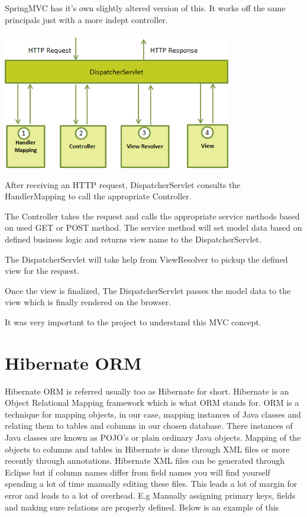 SpringMVC has it's own slightly altered version of this. It works off the same principals just with a more indept controller.

\begin{center}    
	\includegraphics[height=6cm, width=10cm]{img/springmvc.png}
\end{center}

\noindent After receiving an HTTP request, DispatcherServlet consults the HandlerMapping to call the appropriate Controller. \newline

\noindent The Controller takes the request and calls the appropriate service methods based on used GET or POST method. The service method will set model data based on defined business logic and returns view name to the DispatcherServlet. \newline

\noindent The DispatcherServlet will take help from ViewResolver to pickup the defined view for the request. \newline 

\noindent Once the view is finalized, The DispatcherServlet passes the model data to the view which is finally rendered on the browser. \newline

\noindent It was very important to the project to understand this MVC concept.

\section{Hibernate ORM}

Hibernate ORM is referred usually too as Hibernate for short. Hibernate is an Object Relational Mapping framework which is what ORM stands for. ORM is a technique for mapping objects, in our case, mapping instances of Java classes and relating them to tables and columns in our chosen database. There instances of Java classes are known as POJO's or plain ordinary Java objects. Mapping of the objects to columns and tables in Hibernate is done through XML files or more recently through annotations. Hibernate XML files can be generated through Eclipse but if column names differ from field names you will find yourself spending a lot of time manually editing these files. This leads a lot of margin for error and leads to a lot of overhead. E.g Manually assigning primary keys, fields and making sure relations are properly defined. 
\noindent \newline \newline Below is an example of this 

